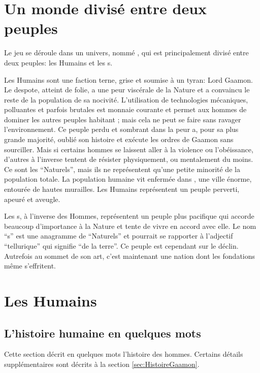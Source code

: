 \section{Un monde divisé entre deux peuples}
Le jeu se déroule dans un univers, nommé \nomUnivers, qui est principalement divisé entre deux peuples: les Humains et les \nomNaturels s.

Les Humains sont une faction terne, grise et soumise à un tyran: Lord Gaamon. Le despote, atteint de folie, a une peur viscérale de la Nature et a convaincu le reste de la population de sa nocivité. L'utilisation de technologies mécaniques, polluantes et parfois brutales est monnaie courante et permet aux hommes de dominer les autres peuples habitant \nomUnivers; mais cela ne peut se faire sans ravager l'environnement. Ce peuple perdu et sombrant dans la peur a, pour sa plus grande majorité, oublié son histoire et exécute les ordres de Gaamon sans sourciller. Mais si certains hommes se laissent aller à la violence ou l'obéissance, d'autres à l'inverse tentent de résister physiquement, ou mentalement du moins. Ce sont les \enquote{Naturels}, mais ils ne représentent qu'une petite minorité de la population totale. La population humaine vit enfermée dans \nomVille, une ville énorme, entourée de hautes murailles. Les Humains représentent un peuple perverti, apeuré et aveugle.

Les \nomNaturels s, à l'inverse des Hommes, représentent un peuple plus pacifique qui accorde beaucoup d'importance à la Nature et tente de vivre en accord avec elle. Le nom \enquote{\nomNaturels s} est une anagramme de \enquote{Naturels} et pourrait se rapporter à l'adjectif \enquote{tellurique} qui signifie \enquote{de la terre}. Ce peuple est cependant sur le déclin. Autrefois au sommet de son art, c'est maintenant une nation dont les fondations même s'effritent.


\section{Les Humains}

\subsection{L'histoire humaine en quelques mots}

\begin{note}
	Cette section décrit en quelques mots l'histoire des hommes. Certains détails supplémentaires sont décrits à la section \ref{sec:HistoireGaamon}.
\end{note}


